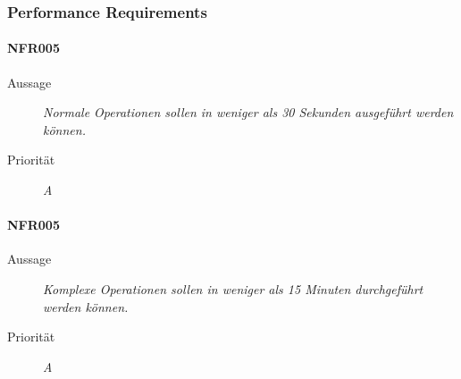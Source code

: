 \subsubsection{Performance Requirements}

\paragraph{NFR005}
\begin{description}
     \item[Aussage]
        \textit{Normale Operationen sollen in weniger als 30 Sekunden ausgef\"uhrt werden k\"onnen.}
    \item [Priorit\"at] \textit{A}
\end{description}

\paragraph{NFR005}
\begin{description}
     \item[Aussage]
        \textit{Komplexe Operationen sollen in weniger als 15 Minuten durchgef\"uhrt werden k\"onnen.}
    \item [Priorit\"at] \textit{A}
\end{description}